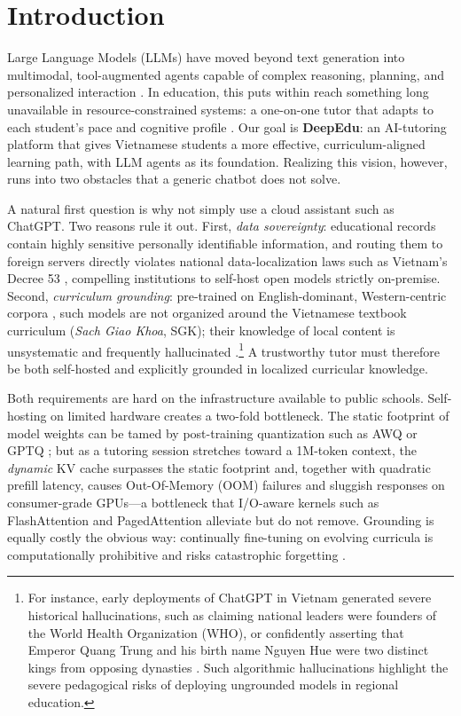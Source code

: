 \documentclass[10pt,conference]{IEEEtran}
\begin{document}
\section{Introduction}

Large Language Models (LLMs) have moved beyond text generation into multimodal, tool-augmented agents capable of complex reasoning, planning, and personalized interaction \cite{touvron2023llama, bai2023qwen, yao2023react}. In education, this puts within reach something long unavailable in resource-constrained systems: a one-on-one tutor that adapts to each student's pace and cognitive profile \cite{llmeducation2026}. Our goal is \textbf{DeepEdu}: an AI-tutoring platform that gives Vietnamese students a more effective, curriculum-aligned learning path, with LLM agents as its foundation. Realizing this vision, however, runs into two obstacles that a generic chatbot does not solve.

A natural first question is why not simply use a cloud assistant such as ChatGPT. Two reasons rule it out. First, \emph{data sovereignty}: educational records contain highly sensitive personally identifiable information, and routing them to foreign servers directly violates national data-localization laws such as Vietnam's Decree 53 \cite{vietnam_decree53}, compelling institutions to self-host open models strictly on-premise. Second, \emph{curriculum grounding}: pre-trained on English-dominant, Western-centric corpora \cite{cahyawijaya2024llms}, such models are not organized around the Vietnamese textbook curriculum (\emph{Sach Giao Khoa}, SGK); their knowledge of local content is unsystematic and frequently hallucinated \cite{vnexpress_chatgpt_education_2023}.\footnote{For instance, early deployments of ChatGPT in Vietnam generated severe historical hallucinations, such as claiming national leaders were founders of the World Health Organization (WHO), or confidently asserting that Emperor Quang Trung and his birth name Nguyen Hue were two distinct kings from opposing dynasties \cite{dnto_chatgpt_2023}. Such algorithmic hallucinations highlight the severe pedagogical risks of deploying ungrounded models in regional education.} A trustworthy tutor must therefore be both self-hosted and explicitly grounded in localized curricular knowledge.

Both requirements are hard on the infrastructure available to public schools. Self-hosting on limited hardware creates a two-fold bottleneck. The static footprint of model weights can be tamed by post-training quantization such as AWQ \cite{lin2024awq} or GPTQ \cite{frantar2023gptq}; but as a tutoring session stretches toward a 1M-token context, the \emph{dynamic} KV cache surpasses the static footprint and, together with quadratic prefill latency, causes Out-Of-Memory (OOM) failures and sluggish responses on consumer-grade GPUs---a bottleneck that I/O-aware kernels such as FlashAttention \cite{dao2022flashattention} and PagedAttention \cite{kwon2023efficient} alleviate but do not remove. Grounding is equally costly the obvious way: continually fine-tuning on evolving curricula is computationally prohibitive and risks catastrophic forgetting \cite{efficientcpt2025naacl}.
\end{document}
